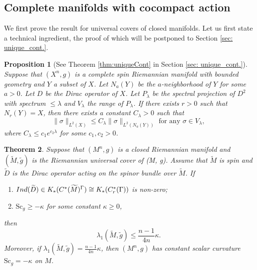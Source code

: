 \documentclass[12pt, reqno]{amsart}
\theoremstyle{plain}%
\newtheorem{theorem}{Theorem}[section]
\newtheorem{proposition}[theorem]{Proposition}
\theoremstyle{definition}
\theoremstyle{remark}
\numberwithin{equation}{section}
\newcommand{\Sc}{\mathrm{Sc}}
\newcommand{\ind}{\textup{Ind}}
\begin{document}
\subsection{Complete manifolds with cocompact action}
We first prove the result for universal covers of closed manifolds. Let us first state a technical ingredient, the proof of which will be postponed to Section \ref{sec: unique_cont.}.
\begin{proposition}[See Theorem \ref{thm:uniqueCont} in Section \ref{sec: unique_cont.}]\label{prop:uniqueCont}
Suppose that $(X^n, g)$ is a complete spin Riemannian manifold with bounded geometry and  $Y$ a subset of $X$. Let $N_a(Y)$ be the $a$-neighborhood of $Y$ for some $a>0$. Let $D$ be the Dirac operator of $X$. Let  $P_\lambda$ be the spectral projection of $D^2$ with spectrum $\leq \lambda$ and $V_\lambda$ the range of $P_\lambda$. If there exists $r>0$ such that $N_r(Y)=X$, then there exists a constant $C_\lambda>0$ such that
	$$\|\sigma\|_{L^2(X)}\leq C_\lambda\|\sigma\|_{L^2(N_a(Y))}\text{ for any }\sigma\in V_\lambda,$$
    where $C_\lambda\leq c_1e^{c_2\lambda}$ for some $c_1,c_2>0$.
\end{proposition}

\begin{theorem}\label{thm:cover}
	Suppose that $(M^n,g)$ is a closed Riemannian manifold and $(\widetilde M,\widetilde g)$ is the Riemannian universal cover of (M, g). Assume that $\widetilde M$ is spin and $\widetilde D$ is the Dirac operator acting on the spinor bundle over $\widetilde M$. If
	\begin{enumerate}
		\item $\ind(\widetilde D)\in K_*(C^*(\widetilde M)^\Gamma)\cong K_*(C^*_r(\Gamma))$ is non-zero;
		\item $\Sc_{g}\geq -\kappa$ for some constant $\kappa\geq 0$,
	\end{enumerate} 
	then $$\lambda_1(\widetilde M,\widetilde g)\leq \frac{n-1}{4n}\kappa.$$
	Moreover, if $\lambda_1(\widetilde M,\widetilde g)= \frac{n-1}{4n}\kappa$,  then $(M^n, g)$ has constant scalar curvature $\Sc_{g}=-\kappa$ on $M$.
\end{theorem}
\end{document}
